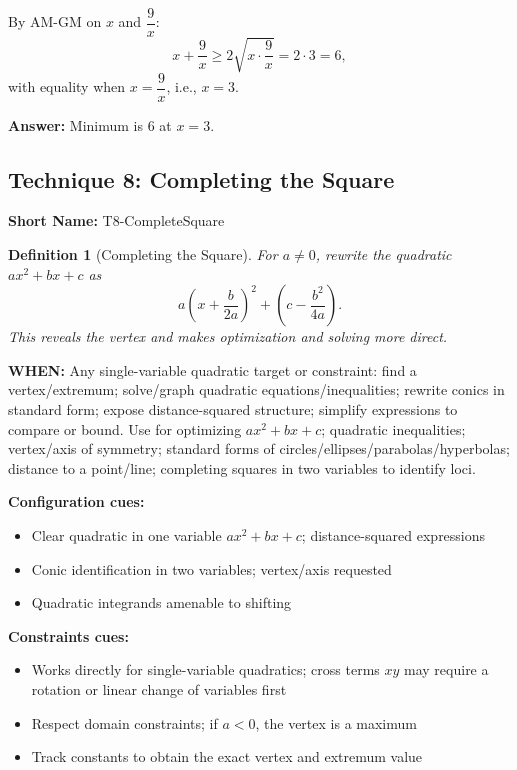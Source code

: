 \documentclass[12pt]{article}
\newtheorem{definition}{Definition}[section]
\newenvironment{solution}
{\begin{tcolorbox}[colback=green!5!white,colframe=green!75!black,title={Solution}]}{\end{tcolorbox}}
\begin{document}
\begin{solution}
By AM-GM on $x$ and $\dfrac{9}{x}$:
\[
x + \frac{9}{x} \ge 2\sqrt{x \cdot \frac{9}{x}} = 2 \cdot 3 = 6,
\]
with equality when $x = \dfrac{9}{x}$, i.e., $x = 3$.

\textbf{Answer:} Minimum is $6$ at $x = 3$.
\end{solution}

\subsection{Technique 8: Completing the Square}
\textbf{Short Name:} T8-CompleteSquare

\begin{definition}[Completing the Square]
For $a \ne 0$, rewrite the quadratic $ax^2 + bx + c$ as
\[
 a\left(x + \frac{b}{2a}\right)^2 + \left(c - \frac{b^2}{4a}\right).
\]
This reveals the vertex and makes optimization and solving more direct.
\end{definition}

\textbf{WHEN:} Any single-variable quadratic target or constraint: find a vertex/extremum; solve/graph quadratic equations/inequalities; rewrite conics in standard form; expose distance-squared structure; simplify expressions to compare or bound. Use for optimizing $ax^2+bx+c$; quadratic inequalities; vertex/axis of symmetry; standard forms of circles/ellipses/parabolas/hyperbolas; distance to a point/line; completing squares in two variables to identify loci.

\textbf{Configuration cues:}
\begin{itemize}
    \item Clear quadratic in one variable $ax^2 + bx + c$; distance-squared expressions
    \item Conic identification in two variables; vertex/axis requested
    \item Quadratic integrands amenable to shifting
\end{itemize}

\textbf{Constraints cues:}
\begin{itemize}
    \item Works directly for single-variable quadratics; cross terms $xy$ may require a rotation or linear change of variables first
    \item Respect domain constraints; if $a < 0$, the vertex is a maximum
    \item Track constants to obtain the exact vertex and extremum value
\end{itemize}
\end{document}
